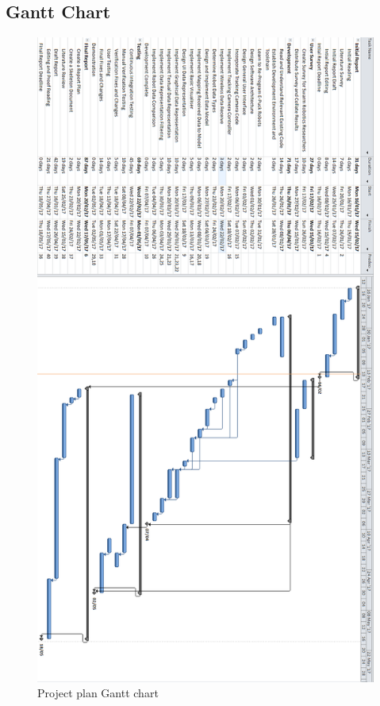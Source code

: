 \documentclass[hidelinks,10pt]{article}
\begin{document}
\begin{appendix}
\section{Gantt Chart}\label{app:GantChart}
\begin{figure}[H]
	\begin{center}
	\includegraphics[scale=0.47]{Gant90.png}
	\caption{Project plan Gantt chart}
	\label{fig:GantChart}
	\end{center}
\end{figure}

\end{appendix}
\newpage
\end{document}
